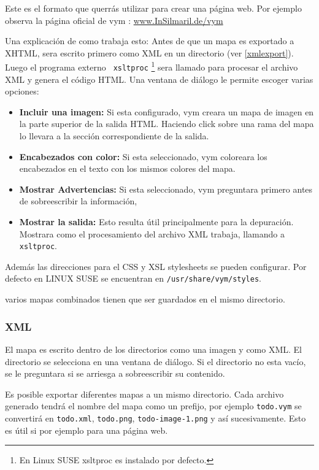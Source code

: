 \documentclass{article}
\newcommand{\vym}{{\sc vym }}
\begin{document}
Este es el formato que querr\'as utilizar para crear una p\'agina web. Por ejemplo observa la p\'agina oficial de \vym:
\href{http://www.InSilmaril.de/vym}{www.InSilmaril.de/vym}

Una explicaci\'on de como trabaja esto: 
Antes de que un mapa es exportado a XHTML, sera escrito primero como XML en un directorio (ver \ref{xmlexport}). Luego el programa externo {\tt
xsltproc} \footnote{En Linux SUSE xsltproc es instalado por defecto.}  
sera llamado para procesar el archivo XML y genera el c\'odigo HTML. Una ventana de di\'alogo le permite escoger varias opciones:
\begin{itemize}
    \item {\bf Incluir una imagen:}  Si esta configurado, \vym creara un mapa de imagen en la parte superior de la salida HTML. Haciendo click sobre una rama del mapa lo llevara a la secci\'on correspondiente de la salida.
    \item {\bf Encabezados con color:}
    Si esta seleccionado, \vym coloreara los encabezados en el texto con los mismos colores del mapa.
    \item {\bf Mostrar Advertencias: }
    Si esta seleccionado, \vym preguntara primero antes de sobreescribir la informaci\'on,
    \item {\bf Mostrar la salida:}
    Esto resulta \'util principalmente para la depuraci\'on. Mostrara como el procesamiento del archivo XML trabaja, llamando a  {\tt xsltproc}.
\end{itemize}
Adem\'as las direcciones para el CSS y XSL stylesheets se pueden configurar. Por defecto en LINUX SUSE se encuentran en
{\tt /usr/share/vym/styles}.


 varios mapas combinados tienen que ser guardados en el mismo directorio.
\subsubsection*{XML} \label{xmlexport}

El mapa es escrito dentro de los directorios como una imagen y como XML. El directorio se selecciona en una ventana de di\'alogo. Si el directorio no esta vac\'io, se le preguntara si se arriesga a sobreescribir su contenido.

Es posible exportar diferentes mapas a un mismo directorio. Cada archivo generado tendr\'a el nombre del mapa como un prefijo, por ejemplo {\tt todo.vym} se convertir\'a en {\tt todo.xml}, {\tt todo.png}, {\tt todo-image-1.png} y as\'i sucesivamente. Esto es \'util si por ejemplo para una p\'agina web.
\end{document}
